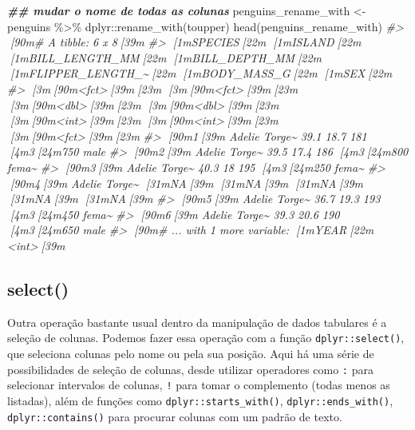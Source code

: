 \documentclass[
]{book}
\newenvironment{Shaded}{\begin{snugshade}}{\end{snugshade}}
\newcommand{\CommentTok}[1]{\textcolor[rgb]{0.37,0.37,0.37}{\textit{#1}}}
\newcommand{\DocumentationTok}[1]{\textcolor[rgb]{0.37,0.37,0.37}{\textbf{\textit{#1}}}}
\newcommand{\FunctionTok}[1]{\textcolor[rgb]{0,0,0}{#1}}
\newcommand{\NormalTok}[1]{#1}
\newcommand{\OtherTok}[1]{\textcolor[rgb]{0.37,0.37,0.37}{#1}}
\newcommand{\SpecialCharTok}[1]{\textcolor[rgb]{0,0,0}{#1}}
\begin{document}
\begin{Shaded}
\begin{Highlighting}[]
\DocumentationTok{\#\# mudar o nome de todas as colunas}
\NormalTok{penguins\_rename\_with }\OtherTok{\textless{}{-}}\NormalTok{ penguins }\SpecialCharTok{\%\textgreater{}\%} 
\NormalTok{  dplyr}\SpecialCharTok{::}\FunctionTok{rename\_with}\NormalTok{(toupper)}
\FunctionTok{head}\NormalTok{(penguins\_rename\_with)}
\CommentTok{\#\textgreater{} [90m\# A tibble: 6 x 8[39m}
\CommentTok{\#\textgreater{}   [1mSPECIES[22m [1mISLAND[22m [1mBILL\_LENGTH\_MM[22m [1mBILL\_DEPTH\_MM[22m [1mFLIPPER\_LENGTH\_\textasciitilde{}[22m [1mBODY\_MASS\_G[22m [1mSEX[22m  }
\CommentTok{\#\textgreater{}   [3m[90m\textless{}fct\textgreater{}[39m[23m   [3m[90m\textless{}fct\textgreater{}[39m[23m           [3m[90m\textless{}dbl\textgreater{}[39m[23m         [3m[90m\textless{}dbl\textgreater{}[39m[23m            [3m[90m\textless{}int\textgreater{}[39m[23m       [3m[90m\textless{}int\textgreater{}[39m[23m [3m[90m\textless{}fct\textgreater{}[39m[23m}
\CommentTok{\#\textgreater{} [90m1[39m Adelie  Torge\textasciitilde{}           39.1          18.7              181        [4m3[24m750 male }
\CommentTok{\#\textgreater{} [90m2[39m Adelie  Torge\textasciitilde{}           39.5          17.4              186        [4m3[24m800 fema\textasciitilde{}}
\CommentTok{\#\textgreater{} [90m3[39m Adelie  Torge\textasciitilde{}           40.3          18                195        [4m3[24m250 fema\textasciitilde{}}
\CommentTok{\#\textgreater{} [90m4[39m Adelie  Torge\textasciitilde{}           [31mNA[39m            [31mNA[39m                 [31mNA[39m          [31mNA[39m [31mNA[39m   }
\CommentTok{\#\textgreater{} [90m5[39m Adelie  Torge\textasciitilde{}           36.7          19.3              193        [4m3[24m450 fema\textasciitilde{}}
\CommentTok{\#\textgreater{} [90m6[39m Adelie  Torge\textasciitilde{}           39.3          20.6              190        [4m3[24m650 male }
\CommentTok{\#\textgreater{} [90m\# ... with 1 more variable: [1mYEAR[22m \textless{}int\textgreater{}[39m}
\end{Highlighting}
\end{Shaded}

\hypertarget{select}{%
\subsection{select()}\label{select}}

Outra operação bastante usual dentro da manipulação de dados tabulares é a seleção de colunas. Podemos fazer essa operação com a função \texttt{dplyr::select()}, que seleciona colunas pelo nome ou pela sua posição. Aqui há uma série de possibilidades de seleção de colunas, desde utilizar operadores como \texttt{:} para selecionar intervalos de colunas, \texttt{!} para tomar o complemento (todas menos as listadas), além de funções como \texttt{dplyr::starts\_with()}, \texttt{dplyr::ends\_with()}, \texttt{dplyr::contains()} para procurar colunas com um padrão de texto.
\end{document}
